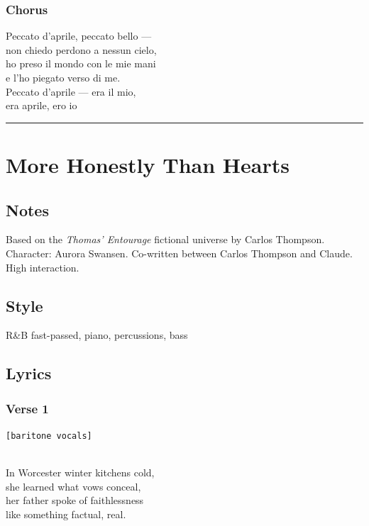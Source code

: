 \subsubsection{Chorus}\label{chorus-20}

Peccato d'aprile, peccato bello ---\\
non chiedo perdono a nessun cielo,\\
ho preso il mondo con le mie mani\\
e l'ho piegato verso di me.\\
Peccato d'aprile --- era il mio,\\
era aprile, ero io

\begin{center}\rule{0.5\linewidth}{0.5pt}\end{center}

\section{More Honestly Than Hearts}\label{more-honestly-than-hearts}

\subsection{Notes}\label{notes-11}

Based on the \emph{Thomas' Entourage} fictional universe by Carlos
Thompson. Character: Aurora Swansen. Co-written between Carlos Thompson
and Claude. High interaction.

\subsection{Style}\label{style-10}

R\&B fast-passed, piano, percussions, bass

\subsection{Lyrics}\label{lyrics-10}

\subsubsection{Verse 1}\label{verse-1-6}

\texttt{{[}baritone\ vocals{]}}\strut \\
In Worcester winter kitchens cold,\\
she learned what vows conceal,\\
her father spoke of faithlessness\\
like something factual, real.

